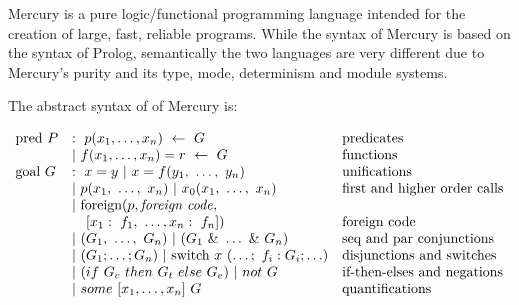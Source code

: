 
Mercury is a pure logic/functional programming language
intended for the creation of large, fast, reliable programs.
While the syntax of Mercury is based on the syntax of Prolog,
semantically the two languages are very different
due to Mercury's purity and its type, mode, determinism and module systems.

The abstract syntax of of Mercury is:

$$
\begin{array}{lll}
\mbox{pred}~P
    & :~ p(x_1, \ldots, x_n)~\leftarrow~G
        & \hbox{predicates} \\
    & |~ f(x_1, \ldots, x_n)=r~\leftarrow~G
        & \hbox{functions} \\
\mbox{goal}~G
    & :~ x = y ~|~ x = f(y_1,~\ldots,~y_n)
        & \hbox{unifications}\\
    & |~ p(x_1,~\ldots,~x_n) ~|~ x_0(x_1,~\ldots,~x_n)
        & \hbox{first and higher order calls} \\
    & |~ \hbox{foreign}(p, \hbox{\emph{foreign code}},
        & \\
    & ~~~ [x_1:~f_1,~\ldots,x_n:~f_n])
        & \hbox{foreign code} \\
    & |~ (G_1,~\ldots,~G_n) ~|~ (G_1~\&~\ldots~\&~G_n)
        & \hbox{seq and par conjunctions}\\
    & |~ (G_1 ; \ldots ; G_n) ~|~ \hbox{switch}~x~(\ldots;~f_i: G_i ; \ldots)
        & \hbox{disjunctions and switches}\\
    & |~ (if~G_c~then~G_t~else~G_e) ~|~ not~G
        & \hbox{if-then-elses and negations}\\
    & |~ some~[x_1,\ldots,x_n]~G
        & \hbox{quantifications}\\
\end{array}
$$
\label{fig:abstractsyntax}

